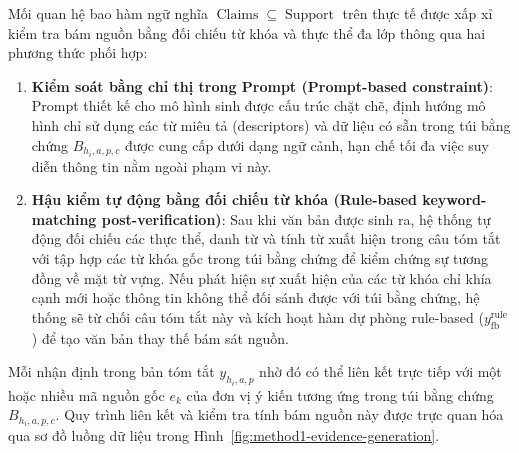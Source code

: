 Mối quan hệ bao hàm ngữ nghĩa $\operatorname{Claims} \subseteq \operatorname{Support}$ trên thực tế được xấp xỉ kiểm tra bám nguồn bằng đối chiếu từ khóa và thực thể đa lớp thông qua hai phương thức phối hợp:
\begin{enumerate}[leftmargin=1.2cm]
    \item \textbf{Kiểm soát bằng chỉ thị trong Prompt (Prompt-based constraint)}: Prompt thiết kế cho mô hình sinh được cấu trúc chặt chẽ, định hướng mô hình chỉ sử dụng các từ miêu tả (descriptors) và dữ liệu có sẵn trong túi bằng chứng $B_{h_i,a,p,c}$ được cung cấp dưới dạng ngữ cảnh, hạn chế tối đa việc suy diễn thông tin nằm ngoài phạm vi này.
    \item \textbf{Hậu kiểm tự động bằng đối chiếu từ khóa (Rule-based keyword-matching post-verification)}: Sau khi văn bản được sinh ra, hệ thống tự động đối chiếu các thực thể, danh từ và tính từ xuất hiện trong câu tóm tắt với tập hợp các từ khóa gốc trong túi bằng chứng để kiểm chứng sự tương đồng về mặt từ vựng. Nếu phát hiện sự xuất hiện của các từ khóa chỉ khía cạnh mới hoặc thông tin không thể đối sánh được với túi bằng chứng, hệ thống sẽ từ chối câu tóm tắt này và kích hoạt hàm dự phòng rule-based ($y_{\mathrm{fb}}^{\mathrm{rule}}$) để tạo văn bản thay thế bám sát nguồn.
\end{enumerate}

Mỗi nhận định trong bản tóm tắt $y_{h_i,a,p}$ nhờ đó có thể liên kết trực tiếp với một hoặc nhiều mã nguồn gốc $e_k$ của đơn vị ý kiến tương ứng trong túi bằng chứng $B_{h_i,a,p,c}$. Quy trình liên kết và kiểm tra tính bám nguồn này được trực quan hóa qua sơ đồ luồng dữ liệu trong Hình~\ref{fig:method1-evidence-generation}.

